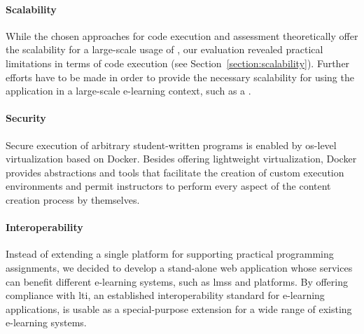 \paragraph{Scalability}

While the chosen approaches for code execution and assessment theoretically offer the scalability for a large-scale usage of \tool, our evaluation revealed practical limitations in terms of code execution (see Section~\ref{section:scalability}). Further efforts have to be made in order to provide the necessary scalability for using the application in a large-scale e-learning context, such as a \mooc.

\paragraph{Security}

Secure execution of arbitrary student-written programs is enabled by \gls{os}-level virtualization based on Docker. Besides offering lightweight virtualization, Docker provides abstractions and tools that facilitate the creation of custom execution environments and permit instructors to perform every aspect of the content creation process by themselves.

\paragraph{Interoperability}

Instead of extending a single \mooc platform for supporting practical programming assignments, we decided to develop a stand-alone web application whose services can benefit different e-learning systems, such as \glspl{lms} and \mooc platforms. By offering compliance with \gls{lti}, an established interoperability standard for e-learning applications, \tool is usable as a special-purpose extension for a wide range of existing e-learning systems.
